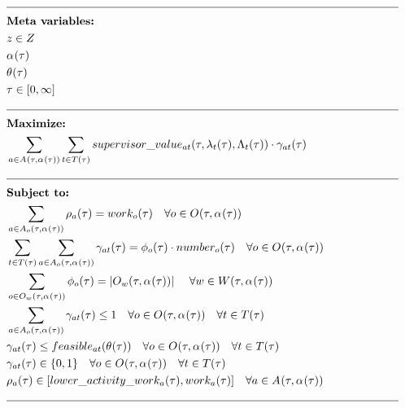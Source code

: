 \begin{alignat}{2}
	& \text{\rule{\linewidth}{0.4pt}} \notag\\
	& \textbf{Meta variables:} \notag\\
	& \ElementSupervisor \in \SetSupervisor \\
	& \VarStrategicWorkOrderAssignment{}{} \\
	& \VarIncludeActivity{} \\
	& \tau \in [0, \infty] \\
	& \text{\rule{\linewidth}{0.4pt}} \notag\\
	& \textbf{Maximize:} \notag\\
	& \sum_{\ElementActivity \in \SetActivity{\VarStrategicWorkOrderAssignment{}{}}{}} \sum_{\ElementTechnician \in \SetTechnician} \ParSupervisorValue \cdot \VarSupervisorAssignment{\ElementActivity}{\ElementTechnician} \\ 
	& \text{\rule{\linewidth}{0.4pt}} \notag\\
	& \textbf{Subject to:} \notag\\ 
	& \sum_{\ElementActivity \in \SetActivity{\VarStrategicWorkOrderAssignment{}{}}{\ElementOperation}} \VarActivityWork{\ElementActivity} = \ParOperationWork{\ElementOperation}    \quad \forall \ElementOperation \in \SetOperation{}{\VarStrategicWorkOrderAssignment{}{}}\\
	& \sum_{\ElementTechnician \in \SetTechnician} \sum_{\ElementActivity \in \SetActivity{\VarStrategicWorkOrderAssignment{}{}}{\ElementOperation}}\VarSupervisorAssignment{\ElementActivity}{\ElementTechnician} = \VarSupervisorAssignmentWhole \cdot \ParNumberOfPeople  \quad \forall \ElementOperation \in \SetOperation{}{\VarStrategicWorkOrderAssignment{}{}}  \\
	& \sum_{\ElementOperation \in \SetOperation{\ElementWorkOrder}{\VarStrategicWorkOrderAssignment{}{}}} \VarSupervisorAssignmentWhole = |\SetOperation{\ElementWorkOrder}{\VarStrategicWorkOrderAssignment{}{}}| \ \quad \forall \ElementWorkOrder \in \SetWorkOrder{,\VarStrategicWorkOrderAssignment{}{}} \\
	& \sum_{\ElementActivity \in \SetActivity{\VarStrategicWorkOrderAssignment{}{}}{\ElementOperation}} \VarSupervisorAssignment{\ElementActivity}{\ElementTechnician} \leq 1  \quad \forall \ElementOperation \in \SetOperation{}{\VarStrategicWorkOrderAssignment{}{}} \quad \forall \ElementTechnician \in \SetTechnician \\  
	& \VarSupervisorAssignment{\ElementActivity}{\ElementTechnician} \leq \ParFeasible  \quad \forall \ElementOperation \in \SetOperation{}{\VarStrategicWorkOrderAssignment{}{}} \quad \forall \ElementTechnician \in \SetTechnician \\
	& \VarSupervisorAssignment{\ElementActivity}{\ElementTechnician} \in \{0, 1\}  \quad \forall \ElementOperation \in \SetOperation{}{\VarStrategicWorkOrderAssignment{}{}} \quad \forall \ElementTechnician \in \SetTechnician \\ 
	& \VarActivityWork{\ElementActivity} \in [\ParLowerActivityWork, \ParOperationWork{\ElementActivity}]  \quad \forall \ElementActivity \in \SetActivity{\VarStrategicWorkOrderAssignment{}{}}{}\\ 
	& \text{\rule{\linewidth}{0.4pt}} \notag
\end{alignat}
